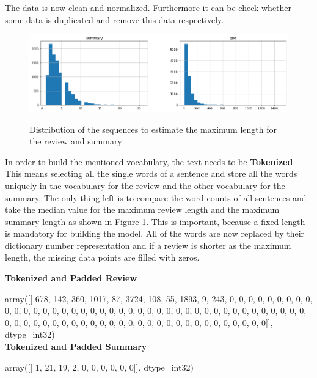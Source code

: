The data is now clean and normalized. Furthermore it can be check whether some data is duplicated and remove this data respectively. 

\begin{figure}
	\begin{center}
		\includegraphics[width=6in]{photos/dist_seq}\\
		\caption{Distribution of the sequences to estimate the maximum length for the review and summary}\label{dist_seq}
	\end{center}
\end{figure}

In order to build the mentioned vocabulary, the text needs to be \textbf{Tokenized}. This means selecting all the single words of a sentence and store all the words uniquely in the vocabulary for the review and the other vocabulary for the summary. The only thing left is to compare the word counts of all sentences and take the median value for the maximum review length and the maximum summary length as shown in Figure \ref{dist_seq}. This is important, because a fixed length is mandatory for building the model. All of the words are now replaced by their dictionary number representation and if a review is shorter as the maximum length, the missing data points are filled with zeros.

\begin{tcolorbox}
	\textbf{Tokenized and Padded Review}
	
	array([[ 678,  142,  360, 1017,   87, 3724,  108,   55, 1893,    9,  243,
	0,    0,    0,    0,    0,    0,    0,    0,    0,    0,    0,
	0,    0,    0,    0,    0,    0,    0,    0,    0,    0,    0,
	0,    0,    0,    0,    0,    0,    0,    0,    0,    0,    0,
	0,    0,    0,    0,    0,    0,    0,    0,    0,    0,    0,
	0,    0,    0,    0,    0,    0,    0,    0,    0,    0,    0,
	0,    0,    0,    0,    0,    0,    0,    0,    0,    0,    0,
	0,    0,    0]], dtype=int32) \\
	
	\textbf{Tokenized and Padded Summary}
	
	array([[ 1, 21, 19,  2,  0,  0,  0,  0,  0,  0]], dtype=int32)
\end{tcolorbox}

